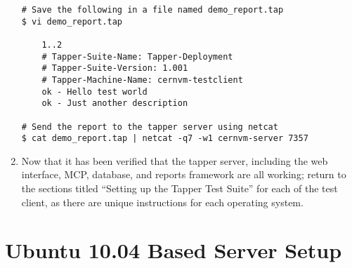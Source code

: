 \begin{enumerate}
\lstset{language=bash,caption= Send a Report to the \tapper~Server from a Test Client}
\begin{lstlisting}
# Save the following in a file named demo_report.tap
$ vi demo_report.tap

	1..2
	# Tapper-Suite-Name: Tapper-Deployment
	# Tapper-Suite-Version: 1.001
	# Tapper-Machine-Name: cernvm-testclient
	ok - Hello test world
	ok - Just another description

# Send the report to the tapper server using netcat
$ cat demo_report.tap | netcat -q7 -w1 cernvm-server 7357
\end{lstlisting}

\item	Now that it has been verified that the tapper server, including the web interface, MCP, database, and reports framework 
		are all working; return to the sections titled ``Setting up the Tapper Test Suite''	for each of the test client, as 
		there are unique instructions for each operating system.
\end{enumerate}




\newpage
\section{Ubuntu 10.04 Based Server Setup}
